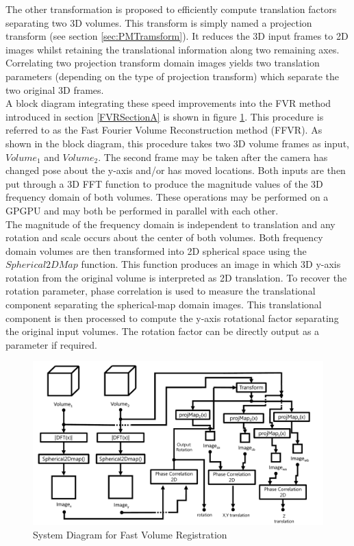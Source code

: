 The other transformation is proposed to efficiently compute translation factors separating two 3D volumes. This transform is simply named a projection transform (see section \ref{sec:PMTramsform}). It reduces the 3D input frames to 2D images whilst retaining the translational information along two remaining axes. Correlating two projection transform domain images yields two translation parameters (depending on the type of projection transform) which separate the two original 3D frames. \\

A block diagram integrating these speed improvements into the FVR method introduced in section \ref{FVRSectionA} is shown in figure \ref{fig:PIPELINE3}. This procedure is referred to as the Fast Fourier Volume Reconstruction method (FFVR). As shown in the block diagram, this procedure takes two 3D volume frames as input, $Volume_1$ and $Volume_2$. The second frame may be taken after the camera has changed pose about the y-axis and/or has moved locations. Both inputs are then put through a 3D FFT function to produce the magnitude values of the 3D frequency domain of both volumes. These operations may be performed on a GPGPU and may both be performed in parallel with each other. \\

The magnitude of the frequency domain is independent to translation and any rotation and scale occurs about the center of both volumes. Both frequency domain volumes are then transformed into 2D spherical space using the $Spherical2DMap$ function. This function produces an image in which 3D y-axis rotation from the original volume is interpreted as 2D translation. To recover the rotation parameter, phase correlation is used to measure the translational component separating the spherical-map domain images. This translational component is then processed to compute the y-axis rotational factor separating the original input volumes. The rotation factor can be directly output as a parameter if required. \\


\begin{figure}[!htb]
\centering
\includegraphics[width=5.0in]{images/ch2/pipeline3}
\caption{System Diagram for Fast Volume Registration}
\label{fig:PIPELINE3}
\end{figure}

